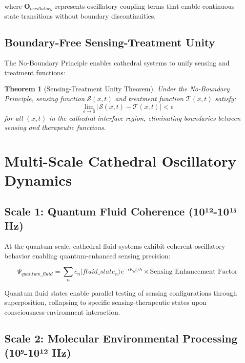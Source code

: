 \documentclass[12pt,a4paper]{article}
\newtheorem{theorem}{Theorem}
\begin{document}
where $\mathbf{O}_{oscillatory}$ represents oscillatory coupling terms that enable continuous state transitions without boundary discontinuities.

\subsection{Boundary-Free Sensing-Treatment Unity}

The No-Boundary Principle enables cathedral systems to unify sensing and treatment functions:

\begin{theorem}[Sensing-Treatment Unity Theorem]
Under the No-Boundary Principle, sensing function $\mathcal{S}(x,t)$ and treatment function $\mathcal{T}(x,t)$ satisfy:
\begin{equation}
\lim_{\epsilon \to 0} |\mathcal{S}(x,t) - \mathcal{T}(x,t)| < \epsilon
\end{equation}
for all $(x,t)$ in the cathedral interface region, eliminating boundaries between sensing and therapeutic functions.
\end{theorem}

\section{Multi-Scale Cathedral Oscillatory Dynamics}

\subsection{Scale 1: Quantum Fluid Coherence (10¹²-10¹⁵ Hz)}

At the quantum scale, cathedral fluid systems exhibit coherent oscillatory behavior enabling quantum-enhanced sensing precision:

\begin{equation}
\Psi_{quantum\_fluid} = \sum_n c_n |fluid\_state_n\rangle e^{-iE_n t/\hbar} \times \text{Sensing Enhancement Factor}
\end{equation}

Quantum fluid states enable parallel testing of sensing configurations through superposition, collapsing to specific sensing-therapeutic states upon consciousness-environment interaction.

\subsection{Scale 2: Molecular Environmental Processing (10⁹-10¹² Hz)}
\end{document}
